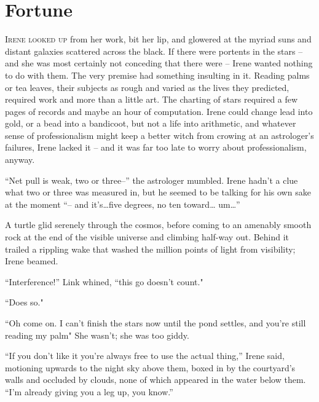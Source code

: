 \documentclass[../FGP.tex]{subfiles}
\begin{document}
\setmarginpargeometry
\section{Fortune}
\noindent \label{sec:fortune}\lettrine[lines=3,loversize=0.039]{I}{rene looked up}%
from her work, bit her lip, and glowered at the myriad suns and distant galaxies scattered across the black. If there were portents in the stars -- and she was most certainly not conceding that there were -- Irene wanted nothing to do with them. The very premise had something insulting in it. Reading palms or tea leaves, their subjects as rough and varied as the lives they predicted, required work and more than a little art. The charting of stars required a few pages of records and maybe an hour of computation. Irene could change lead into gold, or a bead into a bandicoot, but not a life into arithmetic, and whatever sense of professionalism might keep a better witch from crowing at an astrologer's failures, Irene lacked it -- and it was far too late to worry about professionalism, anyway.

``Net pull is weak, two or three--'' the astrologer mumbled. Irene hadn't a clue what two or three was measured in, but he seemed to be talking for his own sake at the moment ``-- and it's\ldots five degrees, no ten toward{\ldots} um{\ldots}''

A turtle glid serenely through the cosmos, before coming to an amenably smooth rock at the end of the visible universe and climbing half-way out. Behind it trailed a rippling wake that washed the million points of light from visibility; Irene beamed.

\normalmarginpar``Interference!'' Link whined, ``this go doesn't count."  

``Does so." 

``Oh come on. I can't finish the stars now until the pond settles, and you're still reading my palm" She wasn't; she was too giddy.

``If you don't like it you're always free to use the actual thing,'' Irene said, motioning upwards to the night sky above them, boxed in by the courtyard's walls and occluded by clouds, none of which appeared in the water below them. ``I'm already giving you a leg up, you know.''
\end{document}
